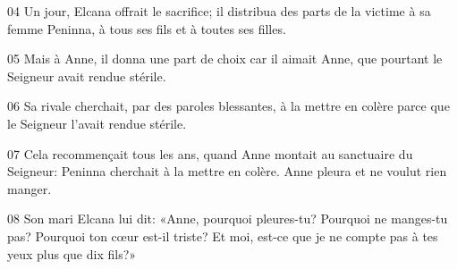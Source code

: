
04 Un jour, Elcana offrait le sacrifice; il distribua des parts de la victime à sa femme Peninna, à tous ses fils et à toutes ses filles.

05 Mais à Anne, il donna une part de choix car il aimait Anne, que pourtant le Seigneur avait rendue stérile.

06 Sa rivale cherchait, par des paroles blessantes, à la mettre en colère parce que le Seigneur l’avait rendue stérile.

07 Cela recommençait tous les ans, quand Anne montait au sanctuaire du Seigneur: Peninna cherchait à la mettre en colère. Anne pleura et ne voulut rien manger.

08 Son mari Elcana lui dit: «Anne, pourquoi pleures-tu? Pourquoi ne manges-tu pas? Pourquoi ton cœur est-il triste? Et moi, est-ce que je ne compte pas à tes yeux plus que dix fils?»
